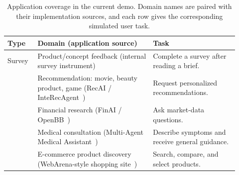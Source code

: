 \begin{table}[t]
\centering
\small
\setlength{\tabcolsep}{4pt}
\renewcommand{\arraystretch}{1.12}
\begin{tabular}{@{}>{\raggedright\arraybackslash}p{0.12\linewidth}>{\raggedright\arraybackslash}p{0.46\linewidth}>{\raggedright\arraybackslash}p{0.34\linewidth}@{}}
\toprule
\textbf{Type} & \textbf{Domain (application source)} & \textbf{Task} \\
\midrule
Survey &
Product/concept feedback (internal survey instrument) &
Complete a survey after reading a brief. \\
\midrule
\multirow{3}{*}{Chatbot} &
Recommendation: movie, beauty product, game (RecAI / InteRecAgent~\citep{huang2023recommender,lian2024recai}) &
Request personalized recommendations. \\
\cmidrule(lr){2-3}
& Financial research (FinAI / OpenBB~\citep{openbb,openbbmcp}) &
Ask market-data questions. \\
\cmidrule(lr){2-3}
& Medical consultation (Multi-Agent Medical Assistant~\citep{majumder2025medicalassistant}) &
Describe symptoms and receive general guidance. \\
\midrule
\multirow{2}{*}{Web} &
E-commerce product discovery (WebArena-style shopping site~\citep{zhou2024webarena}) &
Search, compare, and select products. \\
\bottomrule
\end{tabular}
\caption{Application coverage in the current \method demo. Domain names are paired with their implementation sources, and each row gives the corresponding simulated user task.}
\label{tab:application-coverage}
\end{table}
